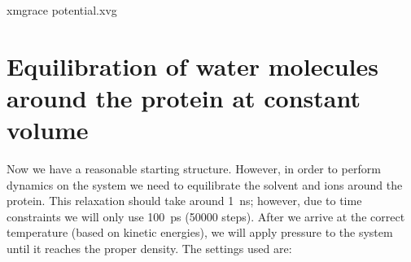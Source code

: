 \documentclass[10pt]{article}
\begin{document}
\begin{cmdline}
xmgrace potential.xvg
\end{cmdline}

\section{Equilibration of water molecules around the protein at constant volume}

Now we have a reasonable starting structure. However, in order to perform dynamics on the system we need to equilibrate the solvent and ions around the protein. This relaxation should take around 1~ns; however, due to time constraints we will only use 100~ps (50000 steps). After we arrive at the correct temperature (based on kinetic energies), we will apply pressure to the system until it reaches the proper density. The settings used are:
\end{document}
